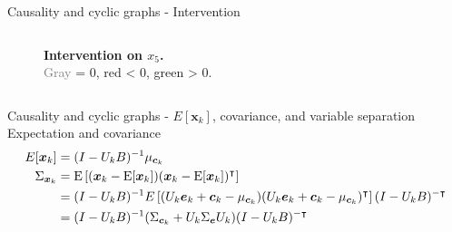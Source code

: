 \begin{frame}{Causality and cyclic graphs - Intervention}
\begin{columns}
\begin{column}{0.35\textwidth}
\begin{figure}
    \caption{\textbf{Intervention on $x_5$.} \\ \textcolor{gray}{Gray} = 0, \textcolor{red!60!black}{red} < 0, \textcolor{green!45!black}{green} > 0.}
    \label{fig:intervention}
\end{figure}
\end{column}
\end{columns}
\end{frame}

\begin{frame}{Causality and cyclic graphs - $E[\boldsymbol{x}_k]$, covariance, and variable separation}
Expectation and covariance
\begin{subequations}
\label{eq:eber_cov}
\begin{align}
E[\boldsymbol{x}_k] &= (I-U_kB) ^{-1} \mu_{\boldsymbol{c}_k}
\\
\Sigma_{\boldsymbol{x}_k}
&=
\operatorname{\text{E}} \left[(\boldsymbol{x}_k - \operatorname{\text{E}}[\boldsymbol{x}_k] )(\boldsymbol{x}_k - \operatorname{\text{E}}[\boldsymbol{x}_k])^\intercal \right]
\\
&= (I-U_kB)^{-1} E\left[ (U_k\boldsymbol{e}_k + \boldsymbol{c}_k - \mu_{\boldsymbol{c}_k})(U_k\boldsymbol{e}_k + \boldsymbol{c}_k - \mu_{\boldsymbol{c}_k})^\intercal \right] (I-U_kB)^{-\intercal}
\\
&= (I-U_kB)^{-1} (\Sigma_{\boldsymbol{c}_k} + U_k\Sigma_{\boldsymbol{e}} U_k) (I-U_kB)^{-\intercal}
\end{align}
\end{subequations}

\end{frame}
